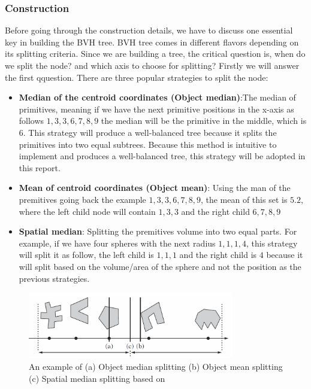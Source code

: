 \documentclass[11pt,a4paper]{article}
\begin{document}
\subsubsection{Construction}
Before going through the construction details, we have to discuss one essential key in building the BVH tree.  BVH tree comes in different flavors depending on its splitting criteria. Since we are building a tree, the critical question is, when do we split the node? and which axis to choose for splitting? Firstly we will answer the first qquestion. There are three popular strategies to split the node:


\begin{itemize}
\item \textbf{Median of the centroid coordinates (Object median)}:The median of primitives, meaning if we have the next primitive positions in the x-axis as follows ${1, 3, 3, 6, 7, 8, 9}$ the median will be the primitive in the middle, which is $6$. This strategy will produce a well-balanced tree because it splits the primitives into two equal subtrees. Because this method is intuitive to implement and produces a well-balanced tree, this strategy will be adopted in this report. 


\item  \textbf{Mean of centroid coordinates (Object mean)}: Using the man of the premitives going back the example ${1, 3, 3, 6, 7, 8, 9}$, the mean of this set is $5.2$, where the left child node will contain ${1,3,3}$ and the right child ${6,7,8,9}$

\item  \textbf{Spatial median}: Splitting the premitives volume into two equal parts. For example, if we have four spheres with the next radius ${1,1,1,4}$, this strategy will split it as follow, the left child is ${1,1,1}$ and the right child is ${4}$ because it will split based on the volume/area of the sphere and not the position as the previous strategies. 

\end{itemize}


\begin{figure}[H]	
     \centering
         \includegraphics[width=9cm]{images/bvh_split.png}
        \caption{An example of (a) Object median splitting (b) Object mean splitting (c) Spatial median
splitting based on \protect\cite{Ericson2004}}
        \label{fig:dice}
\end{figure}
\end{document}
